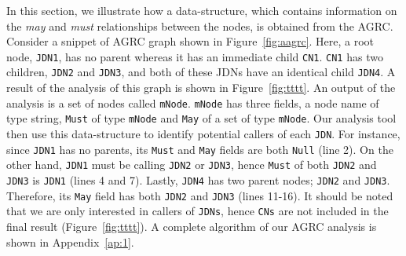 In this section, we illustrate how a data-structure, which contains
information on the \textit{may} and \textit{must} relationships between
the nodes, is obtained from the AGRC. Consider a snippet of AGRC graph
shown in Figure~\ref{fig:aagrc}. Here, a root node, \texttt{JDN1}, has
no parent whereas it has an immediate child \texttt{CN1}. \texttt{CN1}
has two children, \texttt{JDN2} and \texttt{JDN3}, and both of these
JDNs have an identical child \texttt{JDN4}. A result of the analysis of
this graph is shown in Figure~\ref{fig:tttt}. An output of the analysis
is a set of nodes called \texttt{mNode}. \texttt{mNode} has three
fields, a node name of type string, \texttt{Must} of type \texttt{mNode}
and \texttt{May} of a set of type \texttt{mNode}. Our analysis tool then
use this data-structure to identify potential callers of each
\texttt{JDN}. For instance, since \texttt{JDN1} has no parents, its
\texttt{Must} and \texttt{May} fields are both \texttt{Null} (line 2).
On the other hand, \texttt{JDN1} must be calling \texttt{JDN2} or
\texttt{JDN3}, hence \texttt{Must} of both \texttt{JDN2} and
\texttt{JDN3} is \texttt{JDN1} (lines 4 and 7). Lastly, \texttt{JDN4}
has two parent nodes; \texttt{JDN2} and \texttt{JDN3}. Therefore, its
\texttt{May} field has both \texttt{JDN2} and \texttt{JDN3} (lines
11-16). It should be noted that we are only interested in callers of
\texttt{JDNs}, hence \texttt{CNs} are not included in the final result
(Figure~\ref{fig:tttt}). A complete algorithm of our AGRC analysis is
shown in Appendix~\ref{ap:1}.






